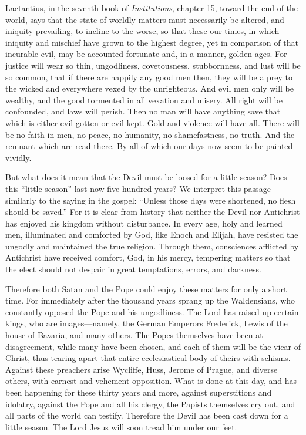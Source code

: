 Lactantius, in the seventh book of \textit{Institutions}, chapter 15, toward the end of the world, says that the state of worldly matters must necessarily be altered, and iniquity prevailing, to incline to the worse, so that these our times, in which iniquity and mischief have grown to the highest degree, yet in comparison of that incurable evil, may be accounted fortunate and, in a manner, golden ages. For justice will wear so thin, ungodliness, covetousness, stubbornness, and lust will be so common, that if there are happily any good men then, they will be a prey to the wicked and everywhere vexed by the unrighteous. And evil men only will be wealthy, and the good tormented in all vexation and misery. All right will be confounded, and laws will perish. Then no man will have anything save that which is either evil gotten or evil kept. Gold and violence will have all. There will be no faith in men, no peace, no humanity, no shamefastness, no truth. And the remnant which are read there. By all of which our days now seem to be painted vividly.

But what does it mean that the Devil must be loosed for a little season? Does this “little season” last now five hundred years? We interpret this passage similarly to the saying in the gospel: “Unless those days were shortened, no flesh should be saved.” For it is clear from history that neither the Devil nor Antichrist has enjoyed his kingdom without disturbance. In every age, holy and learned men, illuminated and comforted by God, like Enoch and Elijah, have resisted the ungodly and maintained the true religion. Through them, consciences afflicted by Antichrist have received comfort, God, in his mercy, tempering matters so that the elect should not despair in great temptations, errors, and darkness.

Therefore both Satan and the Pope could enjoy these matters for only a short time. For immediately after the thousand years sprang up the Waldensians, who constantly opposed the Pope and his ungodliness. The Lord has raised up certain kings, who are images—namely, the German Emperors Frederick, Lewis of the house of Bavaria, and many others. The Popes themselves have been at disagreement, while many have been chosen, and each of them will be the vicar of Christ, thus tearing apart that entire ecclesiastical body of theirs with schisms. Against these preachers arise Wycliffe, Huss, Jerome of Prague, and diverse others, with earnest and vehement opposition. What is done at this day, and has been happening for these thirty years and more, against superstitions and idolatry, against the Pope and all his clergy, the Papists themselves cry out, and all parts of the world can testify. Therefore the Devil has been cast down for a little season. The Lord Jesus will soon tread him under our feet.
